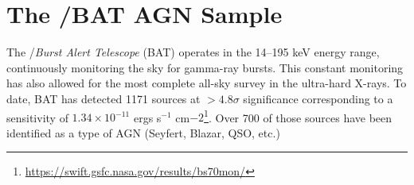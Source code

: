 \section{The \swift/BAT AGN Sample}\label{sample}
The  \swift/\textit{Burst Alert Telescope} (BAT) \citep{Barthelmy:2005ul, Gehrels:2004qf} operates in the 14--195 keV energy range, continuously monitoring the sky for gamma-ray bursts. This constant monitoring has also allowed for the most complete all-sky survey in the ultra-hard X-rays. To date, BAT has detected 1171 sources at  $>4.8\sigma$ significance corresponding to a sensitivity of $1.34\times10^{-11}$ ergs s$^{-1}$ cm${-2}$\footnote{\url{https://swift.gsfc.nasa.gov/results/bs70mon/}}. Over 700 of those sources have been identified as a type of AGN (Seyfert, Blazar, QSO, etc.)
